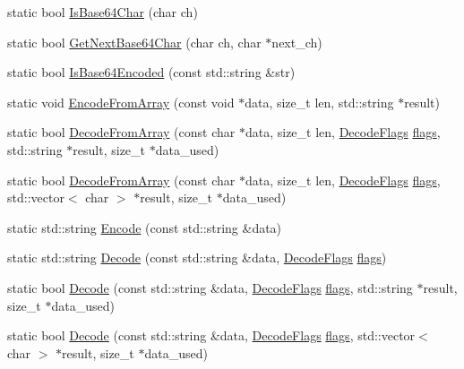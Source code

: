 \begin{DoxyCompactItemize}
\item 
static bool \hyperlink{classmsfs_1_1_base64_ac035c1d830cdc127f818e18e4f2231e8}{Is\+Base64\+Char} (char ch)
\item 
static bool \hyperlink{classmsfs_1_1_base64_a27428e410fa0e22a5ddefaa4173b0a6a}{Get\+Next\+Base64\+Char} (char ch, char $\ast$next\+\_\+ch)
\item 
static bool \hyperlink{classmsfs_1_1_base64_a87bce28923a731be3d65e4a938b4fa1c}{Is\+Base64\+Encoded} (const std\+::string \&str)
\item 
static void \hyperlink{classmsfs_1_1_base64_ae21a3132e6b7e14d8bd73a07c27fec04}{Encode\+From\+Array} (const void $\ast$data, size\+\_\+t len, std\+::string $\ast$result)
\item 
static bool \hyperlink{classmsfs_1_1_base64_a62f0a32e438c55d6a62f0e958b6145eb}{Decode\+From\+Array} (const char $\ast$data, size\+\_\+t len, \hyperlink{classmsfs_1_1_base64_ab044f6b279e3a3c6004dd58ea625b3c7}{Decode\+Flags} \hyperlink{_http_parser_8h_ab6b306ef981f5e21bb41ea2c2dbe8cd9}{flags}, std\+::string $\ast$result, size\+\_\+t $\ast$data\+\_\+used)
\item 
static bool \hyperlink{classmsfs_1_1_base64_a32bb1e8d87c871743b478ab02b9f9a17}{Decode\+From\+Array} (const char $\ast$data, size\+\_\+t len, \hyperlink{classmsfs_1_1_base64_ab044f6b279e3a3c6004dd58ea625b3c7}{Decode\+Flags} \hyperlink{_http_parser_8h_ab6b306ef981f5e21bb41ea2c2dbe8cd9}{flags}, std\+::vector$<$ char $>$ $\ast$result, size\+\_\+t $\ast$data\+\_\+used)
\item 
static std\+::string \hyperlink{classmsfs_1_1_base64_aa2a0cdf6d35b9d7ce5594bada1783899}{Encode} (const std\+::string \&data)
\item 
static std\+::string \hyperlink{classmsfs_1_1_base64_a4b5ae0fcf999bc93e3be1ca552f0dbd0}{Decode} (const std\+::string \&data, \hyperlink{classmsfs_1_1_base64_ab044f6b279e3a3c6004dd58ea625b3c7}{Decode\+Flags} \hyperlink{_http_parser_8h_ab6b306ef981f5e21bb41ea2c2dbe8cd9}{flags})
\item 
static bool \hyperlink{classmsfs_1_1_base64_ad5ce93b74ed80ffc32c816c4897cc6f8}{Decode} (const std\+::string \&data, \hyperlink{classmsfs_1_1_base64_ab044f6b279e3a3c6004dd58ea625b3c7}{Decode\+Flags} \hyperlink{_http_parser_8h_ab6b306ef981f5e21bb41ea2c2dbe8cd9}{flags}, std\+::string $\ast$result, size\+\_\+t $\ast$data\+\_\+used)
\item 
static bool \hyperlink{classmsfs_1_1_base64_a5818dcd7728dc3ceb73f1871fc2cde23}{Decode} (const std\+::string \&data, \hyperlink{classmsfs_1_1_base64_ab044f6b279e3a3c6004dd58ea625b3c7}{Decode\+Flags} \hyperlink{_http_parser_8h_ab6b306ef981f5e21bb41ea2c2dbe8cd9}{flags}, std\+::vector$<$ char $>$ $\ast$result, size\+\_\+t $\ast$data\+\_\+used)
\end{DoxyCompactItemize}
